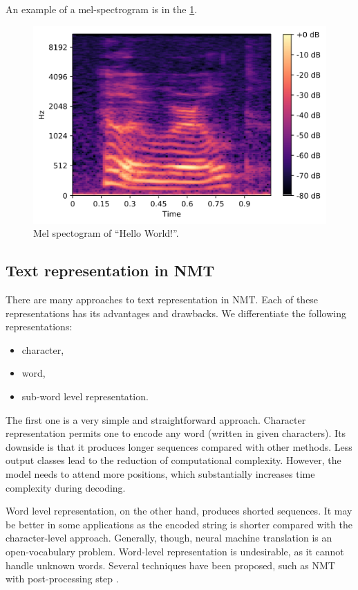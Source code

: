 An example of a mel-spectrogram is in the \cref{fig:mel}.

\begin{figure}[t]
	\centering
	\includegraphics[width=0.8\linewidth]{img/mel.png}
	\caption{Mel spectogram of ``Hello World!''.}
	\label{fig:mel}
\end{figure}

\subsection{Text representation in NMT}
\label{intro:text_repre}

There are many approaches to text representation in NMT. Each of these representations has its advantages and drawbacks. We differentiate the following representations:

\begin{itemize}
	\item character,
	\item word,
	\item sub-word level representation.
\end{itemize}

The first one is a very simple and straightforward approach. Character representation permits one to encode any word (written in given characters). Its downside is that it produces longer sequences compared with other methods. Less output classes lead to the reduction of computational complexity. However, the model needs to attend more positions, which substantially increases time complexity during decoding.

Word level representation, on the other hand, produces shorted sequences. It may be better in some applications as the encoded string is shorter compared with the character-level approach. Generally, though, neural machine translation is an open-vocabulary problem. Word-level representation is undesirable, as it cannot handle unknown words. Several techniques have been proposed, such as NMT with post-processing step .

